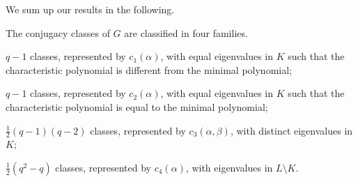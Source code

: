 \documentclass[../main.tex]{subfiles}
\begin{document}
We sum up our results in the following.
\begin{proposition} \label{prop:conj-classes-of-g}
	The conjugacy classes of $G$ are classified in four families.
	\begin{listalph}
		\item $q-1$ classes, represented by $c_1(\alpha)$, with equal eigenvalues in $K$ such that the characteristic polynomial is different from the minimal polynomial;
		\item $q-1$ classes, represented by $c_2(\alpha)$, with equal eigenvalues in $K$ such that the characteristic polynomial is equal to the minimal polynomial;
		\item $\frac12(q-1)(q-2)$ classes, represented by $c_3(\alpha,\beta)$, with distinct eigenvalues in $K$;
		\item $\frac12\left(q^2-q\right)$ classes, represented by $c_4(\alpha)$, with eigenvalues in $L\setminus K$.
	\end{listalph}
\end{proposition}
\end{document}
